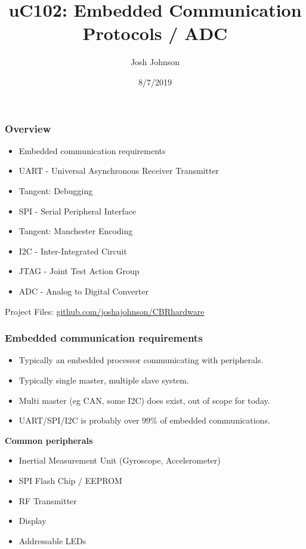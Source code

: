 \documentclass[t]{beamer}
\title[uC102]{uC102: Embedded Communication Protocols / ADC} %
\author{Josh Johnson} %
\institute[] %
{ \\ %
\medskip
\textit{} %
}
\date{8/7/2019} %
\begin{document}
\begin{frame}
\titlepage %
\end{frame}


\begin{frame}
\frametitle{Overview}
\begin{itemize}
\item Embedded communication requirements
\item UART - Universal Asynchronous Receiver Transmitter
\item Tangent: Debugging
\item SPI - Serial Peripheral Interface
\item Tangent: Manchester Encoding
\item I2C - Inter-Integrated Circuit 
\item JTAG	- Joint Test Action Group
\item ADC - Analog to Digital Converter
	

\end{itemize}
\vspace{20mm}
Project Files: \url{github.com/joshajohnson/CBRhardware}\\
\end{frame}


\begin{frame}[t]
\frametitle{Embedded communication requirements}
\begin{itemize}
	\item Typically an embedded processor communicating with peripherals.
	\item Typically single master, multiple slave system.
	\item Multi master (eg CAN, some I2C) does exist, out of scope for today.
	\item UART/SPI/I2C is probably over 99\% of embedded communications.
\end{itemize}
\vspace{5mm}
\textbf{Common peripherals}
\begin{itemize}
	\item Inertial Measurement Unit (Gyroscope, Accelerometer)
	\item SPI Flash Chip / EEPROM
	\item RF Transmitter
	\item Display
	\item Addressable LEDs
\end{itemize}

\end{frame}
\end{document}
